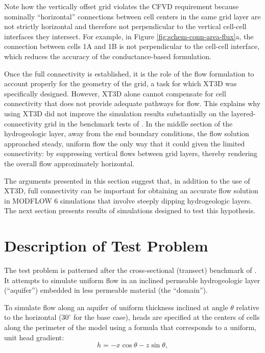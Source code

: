 \documentclass{article}
\begin{document}
Note how the vertically offset grid violates the CFVD requirement because nominally ``horizontal'' connections between cell centers in the same grid layer are not strictly horizontal and therefore not perpendicular to the vertical cell-cell interfaces they intersect. For example, in Figure \ref{fig:schem-conn-area-flux}a, the connection between cells 1A and 1B is not perpendicular to the cell-cell interface, which reduces the accuracy of the conductance-based formulation.

Once the full connectivity is established, it is the role of the flow formulation to account properly for the geometry of the grid, a task for which XT3D was specifically designed. However, XT3D alone cannot compensate for cell connectivity that does not provide adequate pathways for flow. This explains why using XT3D did not improve the simulation results substantially on the layered-connectivity grid in the benchmark tests of \cite{bardot2023}.  In the middle section of the hydrogeologic layer, away from the end boundary conditions, the flow solution approached steady, uniform flow the only way that it could given the limited connectivity: by suppressing vertical flows between grid layers, thereby rendering the overall flow approximately horizontal.

The arguments presented in this section suggest that, in addition to the use of XT3D, full connectivity can be important for obtaining an accurate flow solution in MODFLOW 6 simulations that involve steeply dipping hydrogeologic layers. The next section presents results of simulations designed to test this hypothesis.

\section*{Description of Test Problem}

The test problem is patterned after the cross-sectional (transect) benchmark of \cite{bardot2023}. It attempts to simulate uniform flow in an inclined permeable hydrogeologic layer (``aquifer'') embedded in less permeable material (the ``domain'').

To simulate flow along an aquifer of uniform thickness inclined at angle $\theta$ relative to the horizontal ($30^{\circ}$ for the base case), heads are specified at the centers of cells along the perimeter of the model using a formula that corresponds to a uniform, unit head gradient:
\begin{equation}
\label{eqn:head_analyt_along}
h = - x \cos \theta - z \sin \theta,
\end{equation}
\end{document}
